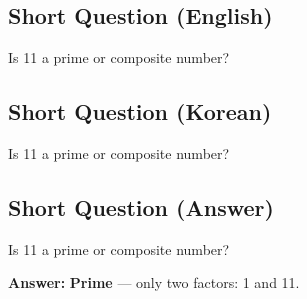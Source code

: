 \cleardoublepage
\subsection*{Short Question (English)}
Is 11 a prime or composite number?


\newpage
\subsection*{Short Question (Korean)}
Is 11 a prime or composite number?


\newpage
\subsection*{Short Question (Answer)}
Is 11 a prime or composite number?

\textbf{Answer:} \textbf{Prime} — only two factors: 1 and 11.
